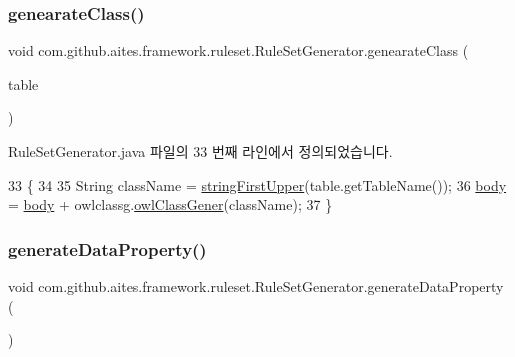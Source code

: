 \subsubsection{\texorpdfstring{genearate\+Class()}{genearateClass()}}
{\footnotesize\ttfamily void com.\+github.\+aites.\+framework.\+ruleset.\+Rule\+Set\+Generator.\+genearate\+Class (\begin{DoxyParamCaption}\item[{\mbox{\hyperlink{classcom_1_1github_1_1aites_1_1framework_1_1dbcomponent_1_1_d_b_table}{D\+B\+Table}}}]{table }\end{DoxyParamCaption})}



Rule\+Set\+Generator.\+java 파일의 33 번째 라인에서 정의되었습니다.


\begin{DoxyCode}
33                                              \{
34         
35         String className = \mbox{\hyperlink{classcom_1_1github_1_1aites_1_1framework_1_1ruleset_1_1_rule_set_generator_a03d399d47d0d6aa6ffbb7c3ce7523fee}{stringFirstUpper}}(table.getTableName());
36         \mbox{\hyperlink{classcom_1_1github_1_1aites_1_1framework_1_1ruleset_1_1_rule_set_generator_a1fbfa36b17c118b50f731278af7d8ae5}{body}} = \mbox{\hyperlink{classcom_1_1github_1_1aites_1_1framework_1_1ruleset_1_1_rule_set_generator_a1fbfa36b17c118b50f731278af7d8ae5}{body}}  + owlclassg.\mbox{\hyperlink{classcom_1_1github_1_1aites_1_1framework_1_1ruleset_1_1_o_w_l_class_generator_a0a7572b2b06c6ebb8a9b1786e607f6ff}{owlClassGener}}(className);
37     \}
\end{DoxyCode}
\mbox{\label{classcom_1_1github_1_1aites_1_1framework_1_1ruleset_1_1_rule_set_generator_a4296b42e9174f9a211a3844b5bc0c17b}} 
\subsubsection{\texorpdfstring{generate\+Data\+Property()}{generateDataProperty()}}
{\footnotesize\ttfamily void com.\+github.\+aites.\+framework.\+ruleset.\+Rule\+Set\+Generator.\+generate\+Data\+Property (\begin{DoxyParamCaption}{ }\end{DoxyParamCaption})}



